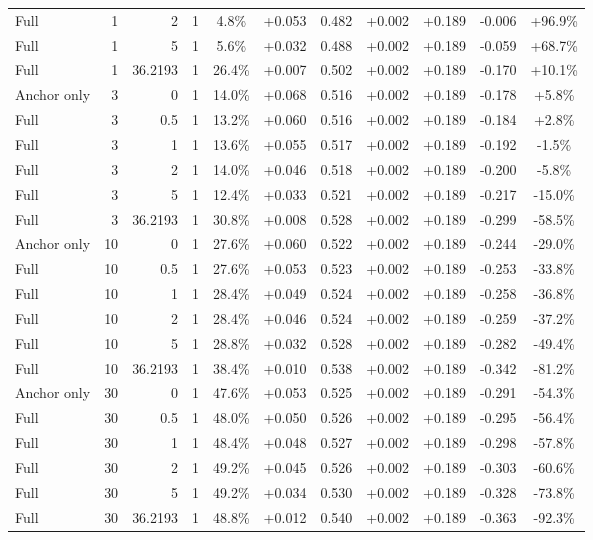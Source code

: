 \begin{table}[htbp]
\begin{tabular}{lrrrccccccc}
Full & 1 & 2 & 1 & 4.8\% & +0.053 & 0.482 & +0.002 & +0.189 & -0.006 & +96.9\% \\
Full & 1 & 5 & 1 & 5.6\% & +0.032 & 0.488 & +0.002 & +0.189 & -0.059 & +68.7\% \\
Full & 1 & 36.2193 & 1 & 26.4\% & +0.007 & 0.502 & +0.002 & +0.189 & -0.170 & +10.1\% \\
Anchor only & 3 & 0 & 1 & 14.0\% & +0.068 & 0.516 & +0.002 & +0.189 & -0.178 & +5.8\% \\
Full & 3 & 0.5 & 1 & 13.2\% & +0.060 & 0.516 & +0.002 & +0.189 & -0.184 & +2.8\% \\
Full & 3 & 1 & 1 & 13.6\% & +0.055 & 0.517 & +0.002 & +0.189 & -0.192 & -1.5\% \\
Full & 3 & 2 & 1 & 14.0\% & +0.046 & 0.518 & +0.002 & +0.189 & -0.200 & -5.8\% \\
Full & 3 & 5 & 1 & 12.4\% & +0.033 & 0.521 & +0.002 & +0.189 & -0.217 & -15.0\% \\
Full & 3 & 36.2193 & 1 & 30.8\% & +0.008 & 0.528 & +0.002 & +0.189 & -0.299 & -58.5\% \\
Anchor only & 10 & 0 & 1 & 27.6\% & +0.060 & 0.522 & +0.002 & +0.189 & -0.244 & -29.0\% \\
Full & 10 & 0.5 & 1 & 27.6\% & +0.053 & 0.523 & +0.002 & +0.189 & -0.253 & -33.8\% \\
Full & 10 & 1 & 1 & 28.4\% & +0.049 & 0.524 & +0.002 & +0.189 & -0.258 & -36.8\% \\
Full & 10 & 2 & 1 & 28.4\% & +0.046 & 0.524 & +0.002 & +0.189 & -0.259 & -37.2\% \\
Full & 10 & 5 & 1 & 28.8\% & +0.032 & 0.528 & +0.002 & +0.189 & -0.282 & -49.4\% \\
Full & 10 & 36.2193 & 1 & 38.4\% & +0.010 & 0.538 & +0.002 & +0.189 & -0.342 & -81.2\% \\
Anchor only & 30 & 0 & 1 & 47.6\% & +0.053 & 0.525 & +0.002 & +0.189 & -0.291 & -54.3\% \\
Full & 30 & 0.5 & 1 & 48.0\% & +0.050 & 0.526 & +0.002 & +0.189 & -0.295 & -56.4\% \\
Full & 30 & 1 & 1 & 48.4\% & +0.048 & 0.527 & +0.002 & +0.189 & -0.298 & -57.8\% \\
Full & 30 & 2 & 1 & 49.2\% & +0.045 & 0.526 & +0.002 & +0.189 & -0.303 & -60.6\% \\
Full & 30 & 5 & 1 & 49.2\% & +0.034 & 0.530 & +0.002 & +0.189 & -0.328 & -73.8\% \\
Full & 30 & 36.2193 & 1 & 48.8\% & +0.012 & 0.540 & +0.002 & +0.189 & -0.363 & -92.3\% \\

\end{tabular}
\end{table}
